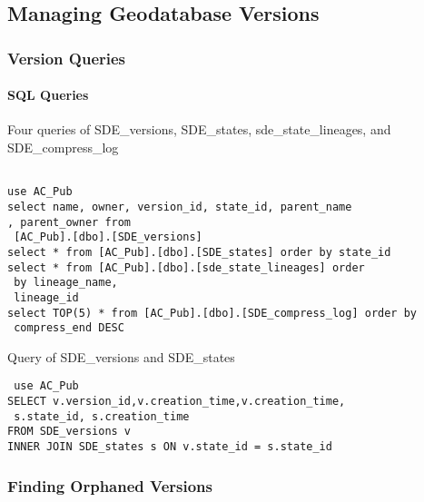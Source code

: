 \documentclass[class=article , crop=false, titlepage, twoside, multi={itemize, figure, verbatim}, float=false]{standalone}
\title{}  %
\begin{document}


\ifstandalone
\maketitle %
\tableofcontents %
\clearpage
\fi

\subsection{Managing Geodatabase Versions}
\medskip 
\subsubsection[Version Queries]{\Large Version Queries}


\paragraph{SQL Queries \texorpdfstring{\\}{}}
Four queries of SDE_versions, SDE_states, sde_state_lineages, and SDE_compress_log

\begin{verbatim}

use AC_Pub
select name, owner, version_id, state_id, parent_name
, parent_owner from
 [AC_Pub].[dbo].[SDE_versions]
select * from [AC_Pub].[dbo].[SDE_states] order by state_id
select * from [AC_Pub].[dbo].[sde_state_lineages] order
 by lineage_name,
 lineage_id
select TOP(5) * from [AC_Pub].[dbo].[SDE_compress_log] order by
 compress_end DESC
 \end{verbatim}
Query of SDE_versions and SDE_states
 
 \begin{verbatim}
 use AC_Pub
SELECT v.version_id,v.creation_time,v.creation_time,
 s.state_id, s.creation_time
FROM SDE_versions v
INNER JOIN SDE_states s ON v.state_id = s.state_id 

\end{verbatim}
\clearpage
\subsubsection[Orphaned Versions]{\Large Finding Orphaned Versions}
\end{document}
